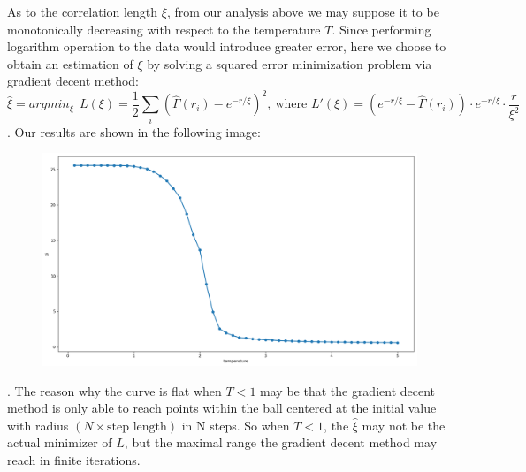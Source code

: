 \documentclass[a4paper]{article}
\begin{document}
As to the correlation length $\xi$, from our analysis above we may suppose it to be monotonically decreasing with respect to the temperature $T$. Since performing logarithm operation to the data would introduce greater error, here we choose to obtain an estimation of $\xi$ by solving a squared error minimization problem via gradient decent method:
\begin{displaymath}
\hat\xi=argmin_\xi\ \ L(\xi) = \frac{1}{2}\sum_i(\hat\Gamma(r_i)-e^{-r/\xi})^2,
\  
\text{where }L'(\xi) = (e^{-r/\xi}-\hat\Gamma(r_i))\cdot e^{-r/\xi}\cdot \frac{r}{\xi ^2}
\end{displaymath}
. Our results are shown in the following image:
\begin{figure}[H]
\centering
\includegraphics[scale=0.325]{xi.png}
\end{figure}
. The reason why the curve is flat when $T<1$ may be that the gradient decent method is only able to reach points within the ball centered at the initial value with radius $(N\times \text{step length})$ in N steps. So when $T < 1$, the $\hat\xi$ may not be the actual minimizer of $L$, but the maximal range the gradient decent method may reach in finite iterations. 
\end{document}
